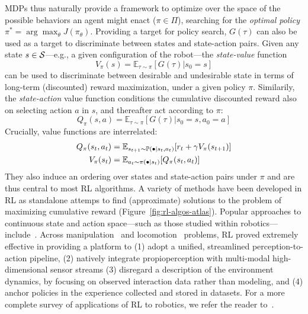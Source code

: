 MDPs thus naturally provide a framework to optimize over the space of the possible behaviors an agent might enact (\( \pi \in \Pi \)), searching for the \emph{optimal policy} \( \pi^* = \arg \max_{\theta} J(\pi_\theta) \).
Providing a target for policy search, \( G(\tau) \) can also be used as a target to discriminate between states and state-action pairs.
Given any state \( s \in \mathcal S \)---e.g., a given configuration of the robot---the \emph{state-value} function
\[
    V_\pi(s) = \mathbb E_{\tau \sim \pi} \left[ G(\tau) \big \vert s_0 = s \right]
\]
can be used to discriminate between desirable and undesirable state in terms of long-term (discounted) reward maximization, under a given policy \(\pi\).
Similarily, the \emph{state-action} value function conditions the cumulative discounted reward also on selecting action \( a \) in \( s \), and thereafter act according to \( \pi \):
\[
    Q_\pi(s,a) = \mathbb E_{\tau \sim \pi} \left[ G (\tau) \big \vert s_0 = s, a_0=a \right]
\]
Crucially, value functions are interrelated:
\begin{align}
Q_\pi(s_t, a_t) &= \mathbb{E}_{\stateplusone \sim \mathbb P(\bullet \vert \state, \action)} \left[ r_t + \gamma V_\pi(\stateplusone) \right] \label{eq:q-as-v} \\
V_\pi(\state) &= \mathbb E_{\action \sim \pi(\bullet \vert \state)} \left[ Q_\pi (\state, \action) \right]
\label{eq:v-as-q}
\end{align}
They also induce an ordering over states and state-action pairs under \( \pi \) and are thus central to most RL algorithms.
A variety of methods have been developed in RL as standalone attemps to find (approximate) solutions to the problem of maximizing cumulative reward (Figure~\ref{fig:rl-algos-atlas}).
Popular approaches to continuous state and action space---such as those studied within robotics---include~\citet{schulmanTrustRegionPolicy2017, schulmanProximalPolicyOptimization2017, haarnojaSoftActorCriticOffPolicy2018}.
Across manipulation~\citep{akkayaSolvingRubiksCube2019} and locomotion~\citep{leeLearningQuadrupedalLocomotion2020} problems, RL proved extremely effective in providing a platform to (1) adopt a unified, streamlined perception-to-action pipeline, (2) natively integrate propioperception with multi-modal high-dimensional sensor streams  (3) disregard a description of the environment dynamics, by focusing on observed interaction data rather than modeling, and (4) anchor policies in the experience collected and stored in datasets.
For a more complete survey of applications of RL to robotics, we refer the reader to~\citet{koberReinforcementLearningRobotics,tangDeepReinforcementLearning2024}.

